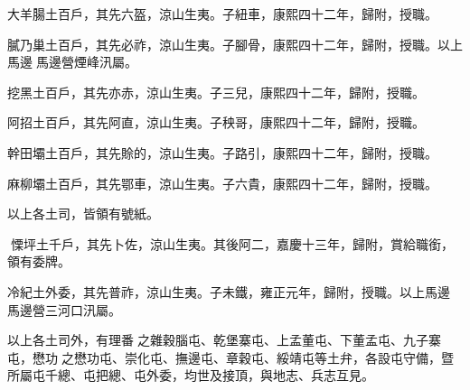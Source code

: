 \begin{pinyinscope}
大羊腸土百戶，其先六盔，涼山生夷。子紐車，康熙四十二年，歸附，授職。

膩乃巢土百戶，其先必祚，涼山生夷。子腳骨，康熙四十二年，歸附，授職。以上馬邊馬邊營煙峰汛屬。

挖黑土百戶，其先亦赤，涼山生夷。子三兒，康熙四十二年，歸附，授職。

阿招土百戶，其先阿直，涼山生夷。子秧哥，康熙四十二年，歸附，授職。

幹田壩土百戶，其先賒的，涼山生夷。子路引，康熙四十二年，歸附，授職。

麻柳壩土百戶，其先鄂車，涼山生夷。子六貴，康熙四十二年，歸附，授職。

以上各土司，皆領有號紙。

慄坪土千戶，其先卜佐，涼山生夷。其後阿二，嘉慶十三年，歸附，賞給職銜，領有委牌。

冷紀土外委，其先普祚，涼山生夷。子未鐵，雍正元年，歸附，授職。以上馬邊馬邊營三河口汛屬。

以上各土司外，有理番之雜穀腦屯、乾堡寨屯、上孟董屯、下董孟屯、九子寨屯，懋功之懋功屯、崇化屯、撫邊屯、章穀屯、綏靖屯等土弁，各設屯守備，暨所屬屯千總、屯把總、屯外委，均世及接頂，與地志、兵志互見。


\end{pinyinscope}